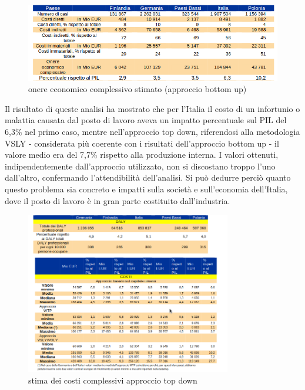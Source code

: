 \vspace{0,5cm}
\begin{figure}[htbp]
    \centering
    \includegraphics[width=\textwidth]{figures/onere_infortuni_ba.png}
    \caption{onere economico complessivo stimato (approccio bottom up)}
    \label{fig:osha_table1}
\end{figure}
\vspace{0,5cm} 

\noindent Il risultato di queste analisi ha mostrato che per l'Italia il costo di un infortunio o malattia causata dal posto di lavoro aveva un impatto percentuale sul PIL del 6,3\% nel primo caso, mentre nell'approccio top down, riferendosi alla metodologia VSLY - considerata più coerente con i risultati dell'approccio bottom up - il valore medio era del 7,7\% rispetto alla produzione interna. I valori ottenuti, indipendentemente dall'approccio utilizzato, non si discostano troppo l'uno dall'altro, confermando l'attendibilità dell'analisi. Si può dedurre perciò quanto questo problema sia concreto e impatti sulla società e sull'economia dell'Italia, dove il posto di lavoro è in gran parte costituito dall'industria. 
 
\begin{figure}[H]
    \centering
    \includegraphics[width=0.8\textwidth]{figures/onere_infortuni_td.png}
    \caption{stima dei costi complessivi approccio top down}
    \label{fig:osha_table2}
\end{figure} 

